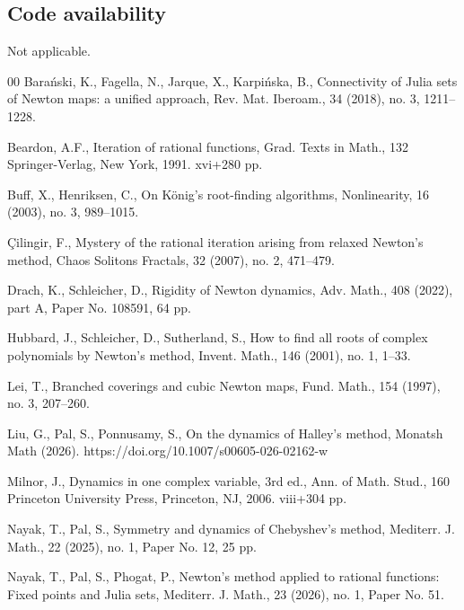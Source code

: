 \documentclass[12pt]{article}
\numberwithin{equation}{section}
\begin{document}
\subsection{Code availability} Not applicable.
\begin{thebibliography}{00}
	 Bara\'{n}ski, K., Fagella, N., Jarque, X., Karpi\'{n}ska, B., Connectivity of Julia sets of Newton maps: a unified approach, Rev. Mat. Iberoam., 34 (2018), no. 3, 1211--1228.
	
	 Beardon, A.F., Iteration of rational functions,
	Grad. Texts in Math., 132
	Springer-Verlag, New York, 1991. xvi+280 pp.
	
	 Buff, X., Henriksen, C., On K\"{o}nig's root-finding algorithms, Nonlinearity, 16 (2003), no. 3, 989--1015.
	
	
	 \c{C}ilingir, F.,
	Mystery of the rational iteration arising from relaxed Newton's method,
	Chaos Solitons Fractals, 32 (2007), no. 2, 471--479.
		
	 Drach, K., Schleicher, D., Rigidity of Newton dynamics,
	Adv. Math., 408 (2022), part A, Paper No. 108591, 64 pp.
		
	 Hubbard, J., Schleicher, D., Sutherland, S., How to find all roots of complex polynomials
	by Newton's method, Invent. Math., 146 (2001), no. 1, 1--33.
	
	 Lei, T., Branched coverings and cubic Newton maps, Fund. Math., 154 (1997), no. 3, 207--260.
	
	 Liu, G., Pal, S., Ponnusamy, S., On the dynamics of Halley's method, Monatsh Math (2026). https://doi.org/10.1007/s00605-026-02162-w
	
	 Milnor, J., Dynamics in one complex variable,
	3rd ed.,
	Ann. of Math. Stud., 160
	Princeton University Press, Princeton, NJ, 2006. viii+304 pp.
	 
	 Nayak, T., Pal, S., Symmetry and dynamics of Chebyshev's method, Mediterr. J. Math.,   22 (2025), no. 1, Paper No. 12, 25 pp.
	
	 Nayak, T., Pal, S., Phogat, P., Newton's method applied to rational functions: Fixed points and Julia sets, Mediterr. J. Math., 23 (2026), no. 1, Paper No. 51.
	

\end{thebibliography}
\end{document}
